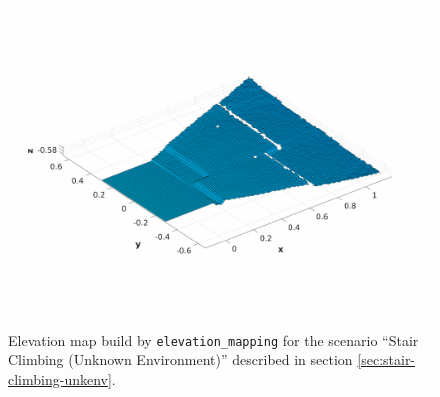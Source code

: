 \begin{figure}
  \centering
  \includegraphics[width=\textwidth]{figures/onlymap-xtion-20cm.pdf}
  \caption{Elevation map build by \texttt{elevation\_mapping} for the scenario 
      ``Stair Climbing (Unknown Environment)'' described in section 
      \ref{sec:stair-climbing-unkenv}.}
  \label{fig:onlymap-xtion-20cm}
\end{figure}

